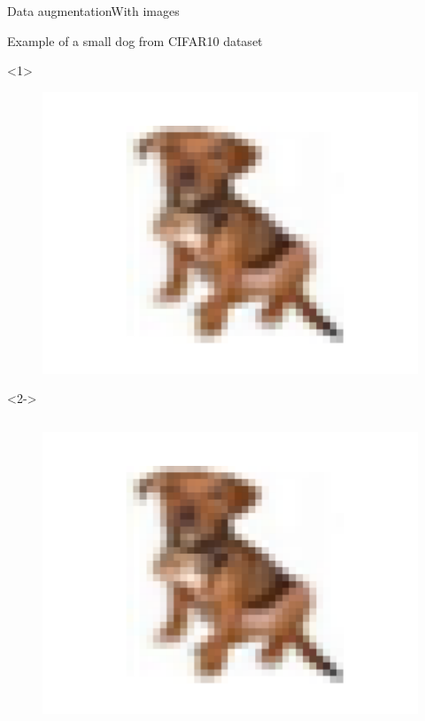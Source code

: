 \documentclass[10pt,aspectratio=43]{beamer}
\begin{document}
\begin{frame}{Data augmentation}{With images}
    \begin{center}
        Example of a small dog from CIFAR10 dataset
    \end{center}
    \begin{onlyenv}<1>
        \begin{figure}
            \centering
            \includegraphics[scale=.6]{dog_cifar.pdf}
        \end{figure}
    \end{onlyenv}
    \begin{onlyenv}<2->
        \centering
    \begin{columns}[t]
        \column{.5\paperwidth}
        \begin{figure}
        \centering
        \includegraphics[scale=.4]{dog_cifar.pdf}

\end{figure}
\end{columns}
\end{onlyenv}
\end{frame}
\end{document}
